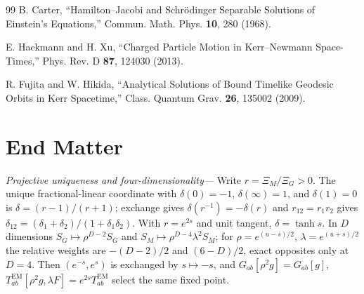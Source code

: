 \documentclass[aps,prl,reprint]{revtex4-2}
\newcommand{\EM}{\mathrm{EM}}
\begin{document}
\begin{thebibliography}{99}
B. Carter,
``Hamilton--Jacobi and Schr\"odinger Separable Solutions of Einstein's Equations,''
Commun. Math. Phys. \textbf{10}, 280 (1968).

E. Hackmann and H. Xu,
``Charged Particle Motion in Kerr--Newmann Space-Times,''
Phys. Rev. D \textbf{87}, 124030 (2013).

R. Fujita and W. Hikida,
``Analytical Solutions of Bound Timelike Geodesic Orbits in Kerr Spacetime,''
Class. Quantum Grav. \textbf{26}, 135002 (2009).

\end{thebibliography}

\section*{End Matter}

\textit{Projective uniqueness and four-dimensionality---}
Write $r=\Xi_M/\Xi_G>0$. The unique fractional-linear coordinate with $\delta(0)=-1$, $\delta(\infty)=1$, and $\delta(1)=0$ is $\delta=(r-1)/(r+1)$; exchange gives $\delta(r^{-1})=-\delta(r)$ and $r_{12}=r_1r_2$ gives $\delta_{12}=(\delta_1+\delta_2)/(1+\delta_1\delta_2)$. With $r=e^{2s}$ and unit tangent, $\delta=\tanh s$. In $D$ dimensions $S_G\mapsto\rho^{D-2}S_G$ and $S_M\mapsto\rho^{D-4}\lambda^2S_M$; for $\rho=e^{(u-s)/2}$, $\lambda=e^{(u+s)/2}$ the relative weights are $-(D-2)/2$ and $(6-D)/2$, exact opposites only at $D=4$. Then $(e^{-s},e^s)$ is exchanged by $s\mapsto-s$, and $G_{ab}[\rho^2g]=G_{ab}[g]$, $T^{\EM}_{ab}[\rho^2g,\lambda F]=e^{2s}T^{\EM}_{ab}$ select the same fixed point.
\end{document}

